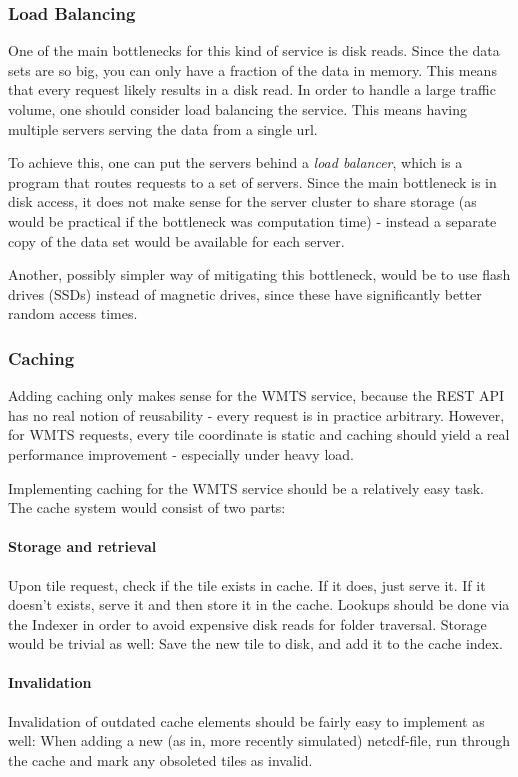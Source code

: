 \documentclass[11pt,a4paper,titlepage,oneside]{report}
\begin{document}
\subsubsection{Load Balancing}
One of the main bottlenecks for this kind of service is disk reads. Since the data sets are so big, you can only have a fraction of the data in memory. This means that every request likely results in a disk read. In order to handle a large traffic volume, one should consider load balancing the service. This means having multiple servers serving the data from a single url.

To achieve this, one can put the servers behind a \textit{load balancer}, which is a program that routes requests to a set of servers. Since the main bottleneck is in disk access, it does not make sense for the server cluster to share storage (as would be practical if the bottleneck was computation time) - instead a separate copy of the data set would be available for each server.

Another, possibly simpler way of mitigating this bottleneck, would be to use flash drives (SSDs) instead of magnetic drives, since these have significantly better random access times.

\subsubsection{Caching}
Adding caching only makes sense for the WMTS service, because the REST API has no real notion of reusability - every request is in practice arbitrary. However, for WMTS requests, every tile coordinate is static and caching should yield a real performance improvement - especially under heavy load.

Implementing caching for the WMTS service should be a relatively easy task. The cache system would consist of two parts:

\paragraph{Storage and retrieval}
Upon tile request, check if the tile exists in cache. If it does, just serve it. If it doesn't exists, serve it and then store it in the cache.
Lookups should be done via the Indexer in order to avoid expensive disk reads for folder traversal.
Storage would be trivial as well: Save the new tile to disk, and add it to the cache index.
\paragraph{Invalidation}
Invalidation of outdated cache elements should be fairly easy to implement as well: When adding a new (as in, more recently simulated) \gls{netcdf}-file, run through the cache and mark any obsoleted tiles as invalid.
\end{document}

